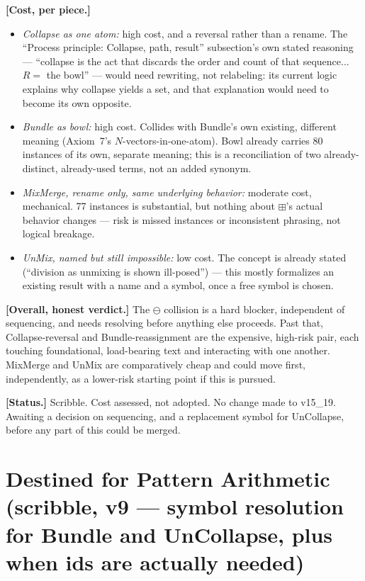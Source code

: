 \documentclass[11pt]{article}
\begin{document}
\textbf{[Cost, per piece.]}
\begin{itemize}
\item \emph{Collapse as one atom:} high cost, and a reversal rather
      than a rename. The ``Process principle: Collapse, path,
      result'' subsection's own stated reasoning --- ``collapse is
      the act that discards the order and count of that sequence...
      $R=$ the bowl'' --- would need rewriting, not relabeling: its
      current logic explains why collapse yields a set, and that
      explanation would need to become its own opposite.
\item \emph{Bundle as bowl:} high cost. Collides with Bundle's own
      existing, different meaning (Axiom~7's $N$-vectors-in-one-atom).
      Bowl already carries 80 instances of its own, separate meaning;
      this is a reconciliation of two already-distinct, already-used
      terms, not an added synonym.
\item \emph{MixMerge, rename only, same underlying behavior:}
      moderate cost, mechanical. 77 instances is substantial, but
      nothing about $\boxplus$'s actual behavior changes --- risk is
      missed instances or inconsistent phrasing, not logical
      breakage.
\item \emph{UnMix, named but still impossible:} low cost. The concept
      is already stated (``division as unmixing is shown ill-posed'')
      --- this mostly formalizes an existing result with a name and a
      symbol, once a free symbol is chosen.
\end{itemize}

\textbf{[Overall, honest verdict.]} The $\ominus$ collision is a hard
blocker, independent of sequencing, and needs resolving before
anything else proceeds. Past that, Collapse-reversal and
Bundle-reassignment are the expensive, high-risk pair, each touching
foundational, load-bearing text and interacting with one another.
MixMerge and UnMix are comparatively cheap and could move first,
independently, as a lower-risk starting point if this is pursued.

\textbf{[Status.]} Scribble. Cost assessed, not adopted. No change
made to v15\_19. Awaiting a decision on sequencing, and a replacement
symbol for UnCollapse, before any part of this could be merged.

\section{Destined for Pattern Arithmetic (scribble, v9 --- symbol
resolution for Bundle and UnCollapse, plus when ids are actually
needed)}
\end{document}

